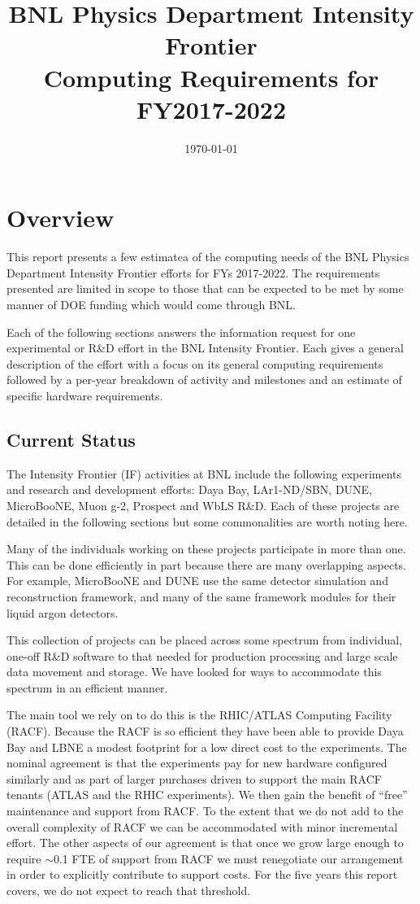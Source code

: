 \documentclass[pdftex,12pt,letter]{article}
\title{BNL Physics Department Intensity Frontier\\Computing Requirements for FY2017-2022}
\date{\today}
\begin{document}
\maketitle
\tableofcontents

%

\newpage
\section{Overview}
This report presents a few estimatea of the computing needs of
the BNL Physics Department Intensity Frontier efforts for FYs
2017-2022. The requirements presented are limited in scope to those
that can be expected to be met by some manner of DOE funding which
would come through BNL.

Each of the following sections answers the information request for one
experimental or R\&D effort in the BNL Intensity Frontier.
Each gives a general description of the effort with a focus on its
general computing requirements followed by a per-year breakdown of activity and
milestones and an estimate of specific hardware requirements.

\subsection{Current Status}

The Intensity Frontier (IF) activities at BNL include the following
experiments and research and development efforts:
%
Daya Bay,
LAr1-ND/SBN,
DUNE,
MicroBooNE,
Muon g-2,
Prospect and
WbLS R\&D.
%
Each of these projects are detailed in the following sections but some
commonalities are worth noting here.

Many of the individuals working on these projects participate in more
than one.
This can be done efficiently in part because there are many
overlapping aspects.
For example, MicroBooNE and DUNE  use the same detector
simulation and reconstruction framework, and many of the same
framework modules for their liquid argon detectors.


This collection of projects can be placed across some spectrum from
individual, one-off R\&D software to that needed for production
processing and large scale data movement and storage.
We have looked for ways to accommodate this spectrum in an efficient
manner.  

The main tool we rely on to do this is the RHIC/ATLAS Computing
Facility (RACF).
Because the RACF is so efficient they have been able to provide Daya
Bay and LBNE a modest footprint for a low direct cost to the
experiments.
The nominal agreement is that the experiments pay for new hardware
configured similarly and as part of larger purchases driven to support
the main RACF tenants (ATLAS and the RHIC experiments).
We then gain the benefit of ``free'' maintenance and support from
RACF.
To the extent that we do not add to the overall complexity of RACF we
can be accommodated with minor incremental effort.
The other aspects of our agreement is that once we grow large enough
to require $\sim$0.1 FTE of support from RACF we must renegotiate our
arrangement in order to explicitly contribute to support costs.
For the five years this report covers, we do not expect to reach that
threshold.  
\end{document}
